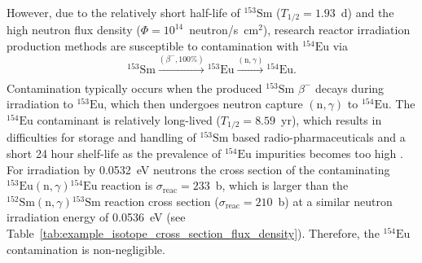 \documentclass[../main.tex]{subfiles}
\begin{document}
However, due to the relatively short half-life of $^{153}\mathrm{Sm}$ ($T_{1/2} = 1.93$~\si{\day}) and the high neutron flux density ($\Phi=10^{14}$~neutron/\si{\second\centi\meter}$^{2}$), research reactor irradiation production methods are susceptible to contamination with $^{154}\mathrm{Eu}$ \cite{naseri2021effective,van2018separation} via
\begin{equation}
^{153}\mathrm{Sm}\xrightarrow[]{\left(\beta^{-},\mathrm{100\%}\right)}{}^{153}\mathrm{Eu}\xrightarrow[]{\left(\mathrm{n},\gamma\right)}{}^{154}\mathrm{Eu}.
\label{eq:153Sm_reactor_contamination}    
\end{equation}
Contamination typically occurs when the produced $^{153}\mathrm{Sm}$ $\beta^{-}$ decays during irradiation to $^{153}\mathrm{Eu}$, which then undergoes neutron capture $\left(\mathrm{n},\gamma\right)$ to $^{154}\mathrm{Eu}$. The $^{154}\mathrm{Eu}$ contaminant is relatively long-lived ($T_{1/2} = 8.59$~yr), which results in difficulties for storage and handling of $^{153}\mathrm{Sm}$ based radio-pharmaceuticals and a short 24 hour shelf-life \cite{ema2015quadramet} as the prevalence of $^{154}\mathrm{Eu}$ impurities becomes too high \cite{van2018separation}. For irradiation by 0.0532~\si{\electronvolt} neutrons the cross section of the contaminating $^{153}\mathrm{Eu}\left(\mathrm{n},\gamma\right){}^{154}\mathrm{Eu}$ reaction is $\sigma_{\mathrm{reac}} = 233$~\si{\barn}, which is larger than the $^{152}\mathrm{Sm}\left(\mathrm{n},\gamma\right){}^{153}\mathrm{Sm}$ reaction cross section ($\sigma_{\mathrm{reac}} = 210$~\si{\barn}) at a similar neutron irradiation energy of 0.0536~\si{\electronvolt} (see Table~\ref{tab:example_isotope_cross_section_flux_density}). Therefore, the $^{154}\mathrm{Eu}$ contamination is non-negligible.
\end{document}
